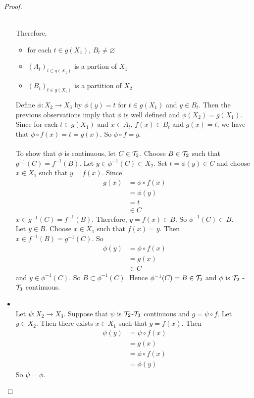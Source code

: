 \documentclass{book}
\begin{document}
\begin{proof}
\begin{itemize}
\begin{itemize}
\begin{align*}
	\end{align*}
	\end{itemize}
	Therefore, 
	\begin{itemize}
	\item for each $t \in g(X_1)$, $B_t \neq \varnothing$
	\item $(A_t)_{t \in g(X_1)}$ is a partion of $X_1$
	\item $(B_t)_{t \in g(X_1)}$ is a partition of $X_2$\\
\end{itemize}		
	 Define $\phi:X_2 \rightarrow X_3$ by $\phi(y) = t$ for $t \in g(X_1)$ and $y \in B_t $. Then the previous observations imply that $\phi$ is well defined and $\phi(X_2) = g(X_1)$. Since for each $t \in g(X_1)$ and $x \in A_t$, $f(x) \in B_t$ and $g(x) = t$, we have that $\phi \circ f (x) = t = g(x)$. So $\phi \circ f = g$. \\ \\
	To show that $\phi$ is continuous, let $C \in \mathcal{T}_3$. Choose $B \in \mathcal{T}_2$ such that $g^{-1}(C) = f^{-1}(B)$.
	Let $y \in \phi^{-1}(C) \subset X_2$. Set $t = \phi(y) \in C$ and choose $x \in X_1$ such that $y = f(x)$. Since 
	\begin{align*}
	g(x) 
	&= \phi \circ f (x) \\
	&= \phi(y) \\
	&= t \\
	&\in C
\end{align*}		
	 $x \in g^{-1}(C) = f^{-1}(B)$. Therefore, $y = f(x) \in B$. So $\phi^{-1}(C) \subset B$. \\
	Let $y \in B$. Choose $x \in X_1$ such that $f(x) = y$. Then $x \in f^{-1}(B) = g^{-1}(C)$. So 
	\begin{align*}
	\phi(y) 
	&= \phi \circ f (x) \\
	&= g(x) \\
	&\in C
	\end{align*}	 
	and $y \in \phi^{-1}(C)$. So $B \subset \phi^{-1}(C)$. 
	Hence $\phi^{-1}(C) = B \in \mathcal{T}_2$ and $\phi$ is $\mathcal{T}_2$ - $\mathcal{T}_3$ continuous.\\
	\item {} \\
	Let $\psi: X_2 \rightarrow X_3$. Suppose that $\psi$ is $\mathcal{T}_2$-$\mathcal{T}_3$ continuous and $g = \psi \circ f$. Let $y \in X_2$. Then there exists $x \in X_1$ such that $y = f(x)$. Then 
	\begin{align*}
	\psi(y) 
	&= \psi \circ f(x) \\
	&= g(x) \\
	&= \phi \circ f(x) \\
	&= \phi(y)
	\end{align*}
	So $\psi = \phi$.
	\end{itemize}
 
	\end{proof}
\end{document}
